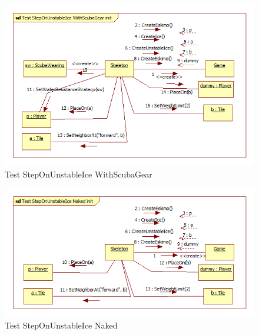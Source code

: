\begin{figure}[H]
	\begin{center}
		\includegraphics[width=17cm]{chapters/chapter05/diagrams/Test_StepOnUnstableIce_WithScubaGear_init.png}
		\caption{Test StepOnUnstableIce WithScubaGear}
		\label{fig:Test StepOnUnstableIce WithScubaGear}
	\end{center}
\end{figure}

\begin{figure}[H]
	\begin{center}
		\includegraphics[width=17cm]{chapters/chapter05/diagrams/Test_StepOnUnstableIce_Naked_init.png}
		\caption{Test StepOnUnstableIce Naked}
		\label{fig:Test StepOnUnstableIce Naked}
	\end{center}
\end{figure}

